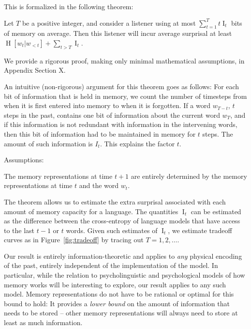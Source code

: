 This is formalized in the following theorem:

\begin{thm}\label{prop:suboptimal}
Let $T$ be a positive integer, and consider a listener using at most $\sum_{t=1}^T t \operatorname{I}_t$ bits of memory on average.
Then this listener will incur average surprisal at least
$\operatorname{H}[w_t|w_{<t}] + \sum_{t > T} \operatorname{I}_t$.
\end{thm}


We provide a rigorous proof, making only minimal mathematical assumptions, in Appendix Section X.

An intuitive (non-rigorous) argument for this theorem goes as follows:
For each bit of information that is held in memory, we count the number of timesteps from when it is first entered into memory to when it is forgotten.
If a word $w_{T-t}$, $t$ steps in the past, contains one bit of information about the current word $w_T$, and if this information is not redundant with information in the intervening words, then this bit of information had to be maintained in memory for $t$ steps.
The amount of such information is $I_t$. This explains the factor $t$.


Assumptions:

The memory representations at time $t+1$ are entirely determined by the memory representations at time $t$ and the word $w_t$.


The theorem allows us to estimate the extra surprisal associated with each amount of memory capacity for a language.
The quantities $\operatorname{I}_t$ can be estimated as the difference between the cross-entropy of language models that have access to the last $t-1$ or $t$ words.
Given such estimates of $\operatorname{I}_t$, we estimate tradeoff curves as in Figure~\ref{fig:tradeoff} by tracing out $T=1, 2, \dots$.


Our result is entirely information-theoretic and applies to \emph{any} physical encoding of the past, entirely independent of the implementation of the model. %
In particular, while the relation to psycholinguistic and psychological models of how memory works will be interesting to explore, our result applies to any such model.
Memory representations do not have to be rational or optimal for this bound to hold:
It provides a \emph{lower bound} on the amount of information that needs to be stored -- other memory representations will always need to store at least as much information.



